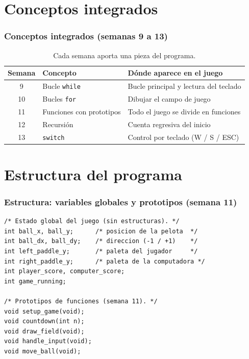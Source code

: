 \documentclass[]{beamer}
\begin{document}
\section{Conceptos integrados}
\begin{frame}
  \frametitle{Conceptos integrados (semanas 9 a 13)}
  \begin{table}
  \centering
  \begin{tabular}{@{}cll@{}}
  \toprule
  \textbf{Semana} & \textbf{Concepto} & \textbf{Dónde aparece en el juego} \\
  \midrule
  9  & Bucle \texttt{while}       & Bucle principal y lectura del teclado \\
  10 & Bucles \texttt{for}        & Dibujar el campo de juego \\
  11 & Funciones con prototipos   & Todo el juego se divide en funciones \\
  12 & Recursión                  & Cuenta regresiva del inicio \\
  13 & \texttt{switch}            & Control por teclado (W / S / ESC) \\
  \bottomrule
  \end{tabular}
  \caption{Cada semana aporta una pieza del programa.}
  \end{table}
\end{frame}

\section{Estructura del programa}
\begin{frame}[fragile]
  \frametitle{Estructura: variables globales y prototipos (semana 11)}
  \lstset{style=myCStyle}
  \begin{lstlisting}
/* Estado global del juego (sin estructuras). */
int ball_x, ball_y;      /* posicion de la pelota  */
int ball_dx, ball_dy;    /* direccion (-1 / +1)    */
int left_paddle_y;       /* paleta del jugador     */
int right_paddle_y;      /* paleta de la computadora */
int player_score, computer_score;
int game_running;

/* Prototipos de funciones (semana 11). */
void setup_game(void);
void countdown(int n);
void draw_field(void);
void handle_input(void);
void move_ball(void);
  \end{lstlisting}
\end{frame}
\end{document}
